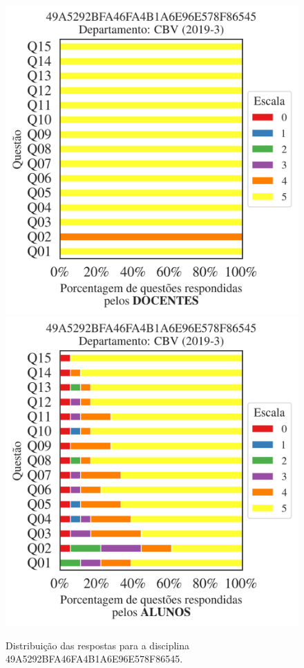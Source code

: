 \documentclass[a4paper,10pt]{article}
\begin{document}
\begin{figure}[h]
\centering
\includegraphics[width=0.485\linewidth]{analise_disciplina_departamento_CBV_49A5292BFA46FA4B1A6E96E578F86545_docentes.png}
\includegraphics[width=0.485\linewidth]{analise_disciplina_departamento_CBV_49A5292BFA46FA4B1A6E96E578F86545_alunos.png}
\caption{\label{fig:analise_geral_departamento}                Distribuição das respostas para a disciplina 49A5292BFA46FA4B1A6E96E578F86545. }
\end{figure}
\end{document}
